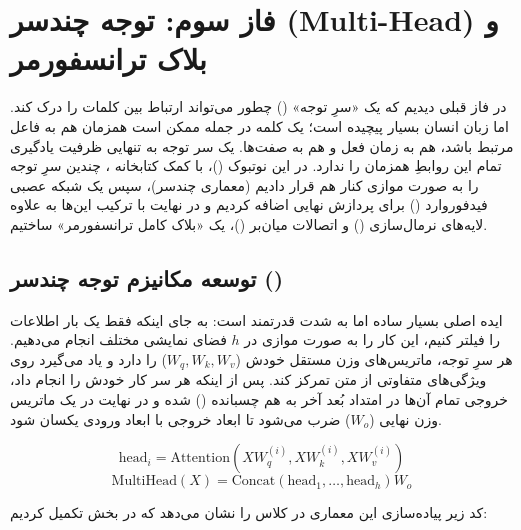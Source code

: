 \documentclass{article}
\begin{document}
\section{فاز سوم: توجه چندسر (Multi-Head) و بلاک ترانسفورمر}

\begin{tcolorbox}[
	colback=softgreen,
	colframe=mygreen,
	title=هدف فاز سوم پروژه (\lr{Multi-Head Attention \& Blocks}),
	attach boxed title to top right={yshift=-2mm, xshift=-5mm},
	boxed title style={colback=mygreen, rounded corners}
	]
	در فاز قبلی دیدیم که یک «سرِ توجه» () چطور می‌تواند ارتباط بین کلمات را درک کند. اما زبان انسان بسیار پیچیده است؛ یک کلمه در جمله ممکن است همزمان هم به فاعل مرتبط باشد، هم به زمان فعل و هم به صفت‌ها. یک سر توجه به تنهایی ظرفیت یادگیری تمام این روابطِ همزمان را ندارد. در این نوتبوک ()، با کمک کتابخانه ، چندین سرِ توجه را به صورت موازی کنار هم قرار دادیم (معماری چندسر)، سپس یک شبکه عصبی فیدفوروارد () برای پردازش نهایی اضافه کردیم و در نهایت با ترکیب این‌ها به علاوه لایه‌های نرمال‌سازی () و اتصالات میان‌بر ()، یک «بلاک کامل ترانسفورمر» ساختیم.
\end{tcolorbox}

\subsection{توسعه مکانیزم توجه چندسر ()}
ایده اصلی  بسیار ساده اما به شدت قدرتمند است: به جای اینکه فقط یک بار اطلاعات را فیلتر کنیم، این کار را به صورت موازی در $h$ فضای نمایشی مختلف انجام می‌دهیم. هر سرِ توجه، ماتریس‌های وزن مستقل خودش ($W_q, W_k, W_v$) را دارد و یاد می‌گیرد روی ویژگی‌های متفاوتی از متن تمرکز کند. 
پس از اینکه هر سر کار خودش را انجام داد، خروجی تمام آن‌ها در امتداد بُعد آخر به هم چسبانده () شده و در نهایت در یک ماتریس وزن نهایی ($W_o$) ضرب می‌شود تا ابعاد خروجی با ابعاد ورودی یکسان شود.

$$ \text{head}_i = \text{Attention}(X W_q^{(i)}, X W_k^{(i)}, X W_v^{(i)}) $$
$$ \text{MultiHead}(X) = \text{Concat}(\text{head}_1, \dots, \text{head}_h) W_o $$

کد زیر پیاده‌سازی این معماری در کلاس  را نشان می‌دهد که در بخش  تکمیل کردیم:
\end{document}
